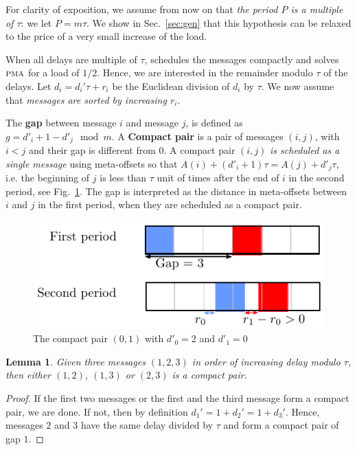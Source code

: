 \documentclass[pdflatex,sn-mathphys,iicol]{sn-jnl}%
\theoremstyle{thmstyleone}%
\newtheorem{lemma}[theorem]{Lemma}
\theoremstyle{thmstyletwo}%
\theoremstyle{thmstylethree}%
\begin{document}
For clarity of exposition, we assume from now on that \emph{the period $P$ is a multiple of $\tau$}: we let $P = m\tau$. We show in Sec.~\ref{sec:gen} that this hypothesis can be relaxed to the price of a very small increase of the load. 

When all delays are multiple of $\tau$, \metaoffset schedules the messages compactly and solves $\textsc{pma}$ for a load of $1/2$. Hence, we are interested in the remainder modulo $\tau$ of the delays. Let $d_i = d_{i}'\tau + r_i$ be the Euclidean division of $d_i$ by $\tau$. We now assume that \emph{messages are sorted by increasing $r_i$}.

The \textbf{gap} between message $i$ and message $j$, is defined as $g = d'_{i} + 1 - d'_{j} \mod m$.
A \textbf{Compact pair} is a pair of messages $(i,j)$, with $i < j$ and their gap is different from $0$. A compact pair $(i,j)$ \emph{is scheduled as a single message} using meta-offsets so that $A(i) + (d'_i+1)\tau = A(j) + d'_j\tau$, i.e. the beginning of $j$ is less than $\tau$ unit of times after the end of $i$ in the second period, see Fig.~\ref{fig:compactpair}. The gap is interpreted as the distance in meta-offsets between $i$ and $j$ in the first period, when they are scheduled as a compact pair.

\begin{figure}[h]
\begin{center}

\includegraphics[scale=0.7]{compact_pair}
\end{center}
\caption{The compact pair $(0,1)$ with $d'_0 = 2$ and $d'_1 = 0$}
\label{fig:compactpair}
\end{figure}

\begin{lemma}\label{lemma:pair_find}
Given three messages $(1,2,3)$ in order of increasing delay modulo $\tau$, then either $(1,2)$, $(1,3)$ or $(2,3)$ is a compact pair. 
\end{lemma}
\begin{proof}
If the first two messages or the first and the third message form a compact pair, we are done. If not, then by definition $d_{1}' = 1 + d_{2}' = 1 + d_{3}'$. Hence, messages $2$ and $3$ have the same delay divided by $\tau$ and form a compact pair of gap $1$.
\end{proof}
\end{document}
